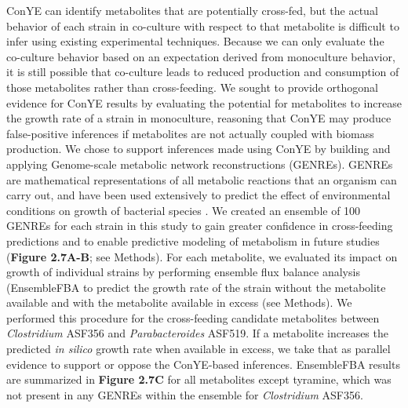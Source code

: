 \documentclass[11pt,onecolumn,notitlepage,openany,twoside]{book}
\begin{document}
\begin{refsection}
ConYE can identify metabolites that are potentially cross-fed, but the actual behavior of each strain in co-culture with respect to that metabolite is difficult to infer using existing experimental techniques. Because we can only evaluate the co-culture behavior based on an expectation derived from monoculture behavior, it is still possible that co-culture leads to reduced production and consumption of those metabolites rather than cross-feeding. We sought to provide orthogonal evidence for ConYE results by evaluating the potential for metabolites to increase the growth rate of a strain in monoculture, reasoning that ConYE may produce false-positive inferences if metabolites are not actually coupled with biomass production. We chose to support inferences made using ConYE by building and applying Genome-scale metabolic network reconstructions (GENREs). GENREs are mathematical representations of all metabolic reactions that an organism can carry out, and have been used extensively to predict the effect of environmental conditions on growth of bacterial species \cite{Oberhardt2009-iu}. We created an ensemble of 100 GENREs for each strain in this study to gain greater confidence in cross-feeding predictions and to enable predictive modeling of metabolism in future studies (\textbf{Figure 2.7A-B}; see Methods). For each metabolite, we evaluated its impact on growth of individual strains by performing ensemble flux balance analysis (EnsembleFBA \cite{Biggs2017-md} to predict the growth rate of the strain without the metabolite available and with the metabolite available in excess (see Methods). We performed this procedure for the cross-feeding candidate metabolites between \textit{Clostridium} ASF356 and \textit{Parabacteroides} ASF519. If a metabolite increases the predicted \textit{in silico} growth rate when available in excess, we take that as parallel evidence to support or oppose the ConYE-based inferences. EnsembleFBA results are summarized in \textbf{Figure 2.7C} for all metabolites except tyramine, which was not present in any GENREs within the ensemble for \textit{Clostridium} ASF356.


\end{refsection}
\end{document}
